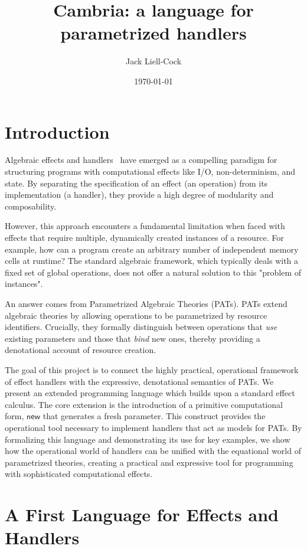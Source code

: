 \documentclass{article}
\title{Cambria: a language for parametrized handlers}
\author{Jack Liell-Cock}
\date{\today}
\theoremstyle{definition}
\theoremstyle{remark}
\newcommand\new{\mathsf{new}}
\begin{document}
\maketitle

\section{Introduction}

Algebraic effects and handlers~\cite{pretnar_introduction_2015} have emerged as a compelling paradigm for structuring programs with computational effects like I/O, non-determinism, and state.
By separating the specification of an effect (an operation) from its implementation (a handler), they provide a high degree of modularity and composability.

However, this approach encounters a fundamental limitation when faced with effects that require multiple, dynamically created instances of a resource.
For example, how can a program create an arbitrary number of independent memory cells at runtime?
The standard algebraic framework, which typically deals with a fixed set of global operations, does not offer a natural solution to this "problem of instances".

An answer comes from Parametrized Algebraic Theories (PATs).
PATs extend algebraic theories by allowing operations to be parametrized by resource identifiers.
Crucially, they formally distinguish between operations that \emph{use} existing parameters and those that \emph{bind} new ones,
thereby providing a denotational account of resource creation.

The goal of this project is to connect the highly practical, operational framework of effect handlers with the expressive, denotational semantics of PATs.
We present an extended programming language which builds upon a standard effect calculus.
The core extension is the introduction of a primitive computational form, $\new$ that generates a fresh parameter.
This construct provides the operational tool necessary to implement handlers that act as models for PATs.
By formalizing this language and demonstrating its use for key examples, we show how the operational world of handlers can be unified with the equational world of parametrized theories,
creating a practical and expressive tool for programming with sophisticated computational effects.

\section{A First Language for Effects and Handlers}
\end{document}
